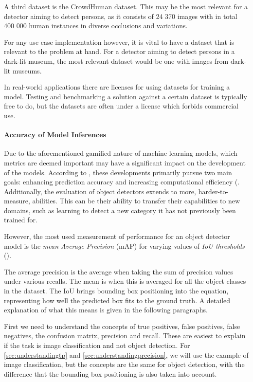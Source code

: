 A third dataset is the CrowdHuman dataset. This may be the most relevant for a detector aiming to detect persons, as it consists of 24 370 images with in total 400 000 human instances in diverse occlusions and variations.

For any use case implementation however, it is vital to have a dataset that is relevant to the problem at hand. For a detector aiming to detect persons in a dark-lit museum, the most relevant dataset would be one with images from dark-lit museums.

In real-world applications there are licenses for using datasets for training a model. Testing and benchmarking a solution against a certain dataset is typically free to do, but the datasets are often under a license which forbids commercial use.

\paragraph{Accuracy of Model Inferences}
\label{sec:accuracy_of_model_inferences}
Due to the aforementioned gamified nature of machine learning models, which metrics are deemed important may have a significant impact on the development of the models. According to \citeauthor{zou2023object_detection_in_20_years}, these developments primarily pursue two main goals: enhancing prediction accuracy and increasing computational efficiency (\citeyear{zou2023object_detection_in_20_years}. Additionally, the evaluation of object detectors extends to more, harder-to-measure, abilities. This can be their ability to transfer their capabilities to new domains, such as learning to detect a new category it has not previously been trained for.

However, the most used measurement of performance for an object detector model is the \textit{mean Average Precision} (mAP) for varying values of \textit{IoU thresholds} (\cite{zou2023object_detection_in_20_years}). 

The average precision is the average when taking the sum of precision values under various recalls. The mean is when this is averaged for all the object classes in the dataset. The IoU brings bounding box positioning into the equation, representing how well the predicted box fits to the ground truth. A detailed explanation of what this means is given in the following paragraphs.

First we need to understand the concepts of true positives, false positives, false negatives, the confusion matrix, precision and recall. These are easiest to explain if the task is image classification and not object detection. For \ref{sec:understandingtp} and \ref{sec:understandingprecision}, we will use the example of image classification, but the concepts are the same for object detection, with the difference that the bounding box positioning is also taken into account.

